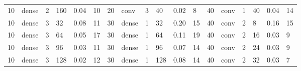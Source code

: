 \begin{table}[t!]
{\begin{tabular}{@{}llllll|llllll|llllll@{}}
10                              & dense                          & 2                              & 160                            & 0.04                             & 10                                & 20                              & conv                           & 3                              & 40                             & 0.02                           & 8                                 & 40                              & conv                           & 1                              & 40                             & 0.04                           & 14                               \\
10                              & dense                          & 3                              & 32                             & 0.08                             & 11                                & 30                              & dense                          & 1                              & 32                             & 0.20                           & 15                                & 40                              & conv                           & 2                              & 8                              & 0.16                           & 15                               \\
10                              & dense                          & 3                              & 64                             & 0.05                             & 17                                & 30                              & dense                          & 1                              & 64                             & 0.11                           & 19                                & 40                              & conv                           & 2                              & 16                             & 0.03                           & 9                                \\
10                              & dense                          & 3                              & 96                             & 0.03                             & 11                                & 30                              & dense                          & 1                              & 96                             & 0.07                           & 14                                & 40                              & conv                           & 2                              & 24                             & 0.03                           & 9                                \\
10                              & dense                          & 3                              & 128                            & 0.02                             & 12                                & 30                              & dense                          & 1                              & 128                            & 0.08                           & 14                                & 40                              & conv                           & 2                              & 32                             & 0.03                           & 7                                \\

\end{tabular}}
\end{table}
